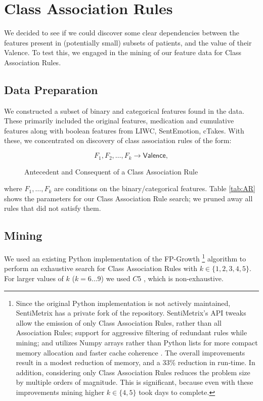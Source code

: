 \chapter{Class Association Rules}\label{sec:assoc-rules} 
 
 We decided to see if we could discover
 some clear dependencies between the features present in
 (potentially small) subsets
 of patients, and the value of their \textsf{Valence}. To test this, we engaged in the mining of our feature data 
 for Class Association Rules.
 
 \section{Data Preparation}
 
 We constructed a subset of binary and categorical features found in the data.
 These primarily included the original features, medication and cumulative
 features along with boolean features from LIWC, SentEmotion, cTakes.
 With these, we concentrated on discovery of class association rules
 of the form:
 
 \begin{figure}[H]
 $$ F_1,F_2,\ldots, F_k\longrightarrow \mathsf{Valence},$$
 \caption{Antecedent and Consequent of a Class Association Rule}
 \end{figure}

\noindent where $F_1,\ldots, F_k$ are conditions on the binary/categorical features. Table \ref{tab:AR}
shows the parameters for our Class Association Rule search; we pruned away all rules that
did not satisfy them.

\section{Mining}

We used an existing Python implementation \cite{python-fp-growth} of the \textsf{FP-Growth} \footnote{
Since the original Python implementation is not actively maintained, SentiMetrix has a private fork of the repository.
SentiMetrix's API tweaks allow the emission of only Class Association Rules, rather than all Association Rules;
 support for aggressive filtering of redundant rules while mining; and utilizes Numpy arrays rather than Python lists for more compact memory allocation and faster cache coherence \cite{numpy}. The overall improvements result in a modest reduction of memory, and a 33\% reduction in run-time. In addition, considering only Class Association Rules reduces the problem size by multiple orders of magnitude. This is significant, because even with these improvements mining higher $k \in \{4, 5\}$ took days to complete. 
 } \cite{fpgrowth} 
algorithm to perform an exhaustive search for Class Association Rules with
$k \in \{1,2,3,4,5\}$.  For larger values of $k$ ($k = 6\ldots 9$) we used
$C5$ \cite{c5,c45}, which is non-exhaustive.

